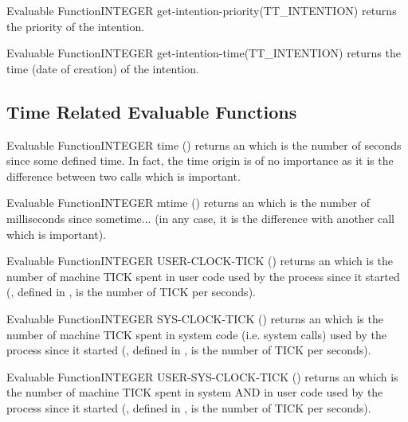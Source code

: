\begin{typeefa}{Evaluable Function}{INTEGER} {get-intention-priority}{(TT\_INTENTION)}
returns the priority of the intention.
\end{typeefa}

\begin{typeefa}{Evaluable Function}{INTEGER} {get-intention-time}{(TT\_INTENTION)}
returns the time (date of creation) of the intention.
\end{typeefa}

\subsection{Time Related Evaluable Functions}

\begin{typeefa}{Evaluable Function}{INTEGER} {time} {()}
returns an  which is the number of seconds since some defined
time. In fact, the time origin is of no importance as it is the difference
between two calls which is important.
\end{typeefa}

\begin{typeefa}{Evaluable Function}{INTEGER} {mtime} {()}
returns an  which is the number of milliseconds since sometime...
(in any case, it is the difference with another call which is important).
\end{typeefa}

\begin{typeefa}{Evaluable Function}{INTEGER} {USER-CLOCK-TICK} {()}
returns an  which is the number of machine TICK spent in user
code used by the \COPRS{} process since it started (, defined in
, is the number of TICK per seconds).
\end{typeefa}

\begin{typeefa}{Evaluable Function}{INTEGER} {SYS-CLOCK-TICK} {()}
returns an  which is the number of machine TICK spent in system
code (i.e. system calls) used by the \COPRS{} process since it started
(, defined in , is the number of TICK per seconds).
\end{typeefa}

\begin{typeefa}{Evaluable Function}{INTEGER} {USER-SYS-CLOCK-TICK} {()}
returns an  which is the number of machine TICK spent in system
AND in user code used by the \COPRS{} process since it started (,
defined in , is the number of TICK per seconds).
\end{typeefa}

